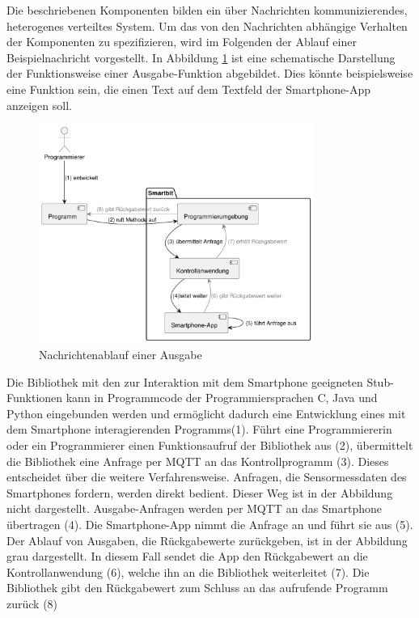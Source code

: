 \documentclass[11pt,a4paper]{report}
\begin{document}
Die beschriebenen Komponenten bilden ein über Nachrichten kommunizierendes, heterogenes verteiltes System.
Um das von den Nachrichten abhängige Verhalten der Komponenten zu spezifizieren, wird im Folgenden der Ablauf einer Beispielnachricht vorgestellt.
In Abbildung \ref{fig:arch_flow} ist eine schematische Darstellung der Funktionsweise einer Ausgabe-Funktion abgebildet.
Dies könnte beispielsweise eine Funktion sein, die einen Text auf dem Textfeld der Smartphone-App anzeigen soll.
\begin{figure}[htbp]
  \centering
  \includegraphics[width=0.8\textwidth]{images/arch_call_flow.pdf}
  \caption{Nachrichtenablauf einer Ausgabe}
  \label{fig:arch_flow}
\end{figure}
Die Bibliothek mit den zur Interaktion mit dem Smartphone geeigneten Stub-Funktionen kann in Programmcode der Programmiersprachen C, Java und Python eingebunden werden und ermöglicht dadurch eine Entwicklung eines mit dem Smartphone interagierenden Programms(1).
Führt eine Programmiererin oder ein Programmierer einen Funktionsaufruf der Bibliothek aus (2), übermittelt die Bibliothek eine Anfrage per MQTT an das Kontrollprogramm (3).
Dieses entscheidet über die weitere Verfahrensweise.
Anfragen, die Sensormessdaten des Smartphones fordern, werden direkt bedient.
Dieser Weg ist in der Abbildung nicht dargestellt.
Ausgabe-Anfragen werden per MQTT an das Smartphone übertragen (4).
Die Smartphone-App nimmt die Anfrage an und führt sie aus (5).
Der Ablauf von Ausgaben, die Rückgabewerte zurückgeben, ist in der Abbildung grau dargestellt.
In diesem Fall sendet die App den Rückgabewert an die Kontrollanwendung (6), welche ihn an die Bibliothek weiterleitet (7).
Die Bibliothek gibt den Rückgabewert zum Schluss an das aufrufende Programm zurück (8)
\end{document}
